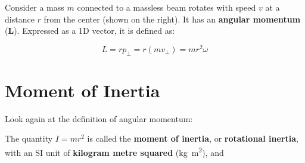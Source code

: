 Consider a mass $m$ connected to a massless beam rotates with speed $v$ at a
distance $r$ from the center (shown on the right). It has an
\textbf{angular momentum} ($\bm L$). Expressed as a 1D vector, it is defined
as:
%  
    
\begin{equation}
  \boxed{
    L=rp_\perp=r(mv_\perp)=mr^2\omega
  }
\end{equation}
%    
\begin{figure}[ht]
  \centering
\end{figure}



\section{Moment of Inertia}

Look again at the definition of angular momentum:

    
The quantity $I=mr^2$ is called the \textbf{moment of inertia}, or
\textbf{rotational inertia}, with an SI unit of \textbf{kilogram metre
  squared} (\si{\kilo\gram\metre\squared}), and 


